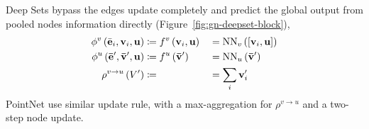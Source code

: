 Deep Sets \citep{zaheer2017deep} bypass the edges update completely and predict the global output from pooled nodes information directly (Figure~\ref{fig:gn-deepset-block}),
\begin{alignat*}{4}
\phi^v\left(\bar{\mathbf{e}}_i, \mathbf{v}_{i}, \mathbf{u}\right) &\coloneqq f^v\left(\mathbf{v}_{i}, \mathbf{u} \right) &&= \mathrm{NN}_{v}\left([\mathbf{v}_{i}, \mathbf{u}]\right) \\
\phi^u\left(\mathbf{\bar{e}}', \mathbf{\bar{v}}', \mathbf{u}\right) &\coloneqq f^u\left(\mathbf{\bar{v}}'\right) &&= \mathrm{NN}_{u}\left(\mathbf{\bar{v}}'\right) \\
\rho^{v\rightarrow u}\left(V'\right) &\coloneqq \; &&= \sum_i \mathbf{v}'_i
\end{alignat*}
PointNet \citep{qi2017pointnet} use similar update rule, with a max-aggregation for $ \rho^{v\rightarrow u}$ and a two-step node update.


\newlength{\threesubht}
\newsavebox{\threesubbox}

